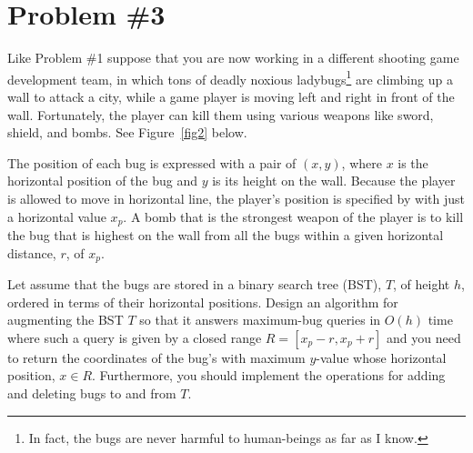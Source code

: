 \documentclass{article}
\begin{document}
% 
\newpage
\section*{Problem \#3} 

Like Problem \#1 suppose that you are now working in a different shooting game development team, in which 
tons of deadly noxious ladybugs\footnote{In fact, the bugs are never harmful to human-beings as far as I know.} are climbing up a wall to attack a city, while a game player is moving left and right
in front of the wall. Fortunately, the player can kill them using various weapons like sword, shield, and bombs. 
See Figure~\ref{fig2} below.


The position of each bug is expressed with a pair of $(x,y)$, where $x$ is the horizontal position of the bug and
$y$ is its height on the wall. Because the player is allowed to move in horizontal line,
the player's position is specified by with just a horizontal value $x_p$.
A bomb that is the strongest weapon of the player is to kill the bug that is highest on the wall from all the bugs within 
a given horizontal distance, $r$, of $x_p$.


Let assume that the bugs are stored in a binary search tree (BST), $T$, of height $h$, ordered in terms of their horizontal positions.
Design an algorithm for augmenting the BST $T$ so that it answers maximum-bug queries in $O(h)$
time where such a query is given by a closed range $R=[x_p-r,x_p+r]$ and 
you need to return the coordinates of the bug's with  maximum $y$-value whose horizontal 
position, $x\in R$. Furthermore, you should implement the operations for adding and deleting bugs to and from $T$.
\end{document}
